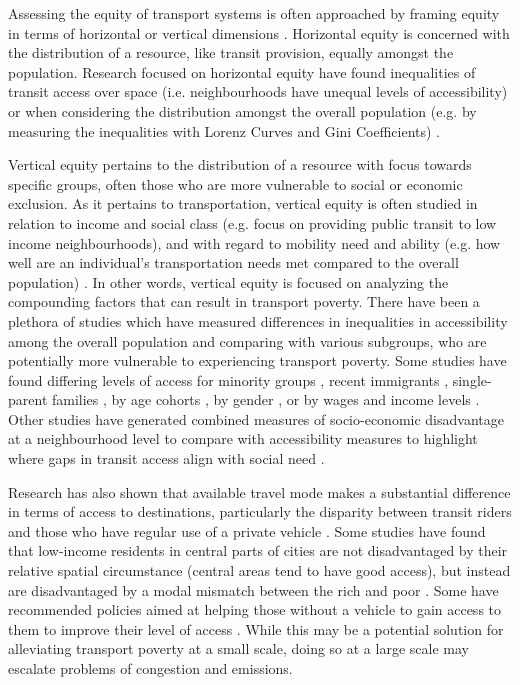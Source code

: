 \documentclass[11 pt, letterpaper]{article}
\begin{document}
{Assessing the equity of transport systems is often approached by framing equity in terms of horizontal or vertical dimensions \cite{litman2002,delbosc2011c,pereira2017}. Horizontal equity is concerned with the distribution of a resource, like transit provision, equally amongst the population. Research focused on horizontal equity have found inequalities of transit access over space (i.e. neighbourhoods have unequal levels of accessibility) or when considering the distribution amongst the overall population (e.g. by measuring the inequalities with Lorenz Curves and Gini Coefficients) \cite{delbosc2011c,martens2012justice, welch2013}.

Vertical equity pertains to the distribution of a resource with focus towards specific groups, often those who are more vulnerable to social or economic exclusion. As it pertains to transportation, vertical equity is often studied in relation to income and social class (e.g. focus on providing public transit to low income neighbourhoods), and with regard to mobility need and ability (e.g. how well are an individual's transportation needs met compared to the overall population) \cite{litman2002,welch2013}. In other words, vertical equity is focused on analyzing the compounding factors that can result in transport poverty. There have been a plethora of studies which have measured differences in inequalities in accessibility among the overall population and comparing with various subgroups, who are potentially more vulnerable to experiencing transport poverty. Some studies have found differing levels of access for minority groups , recent immigrants , single-parent families , by age cohorts , by gender , or by wages and income levels . Other studies have generated combined measures of socio-economic disadvantage at a neighbourhood level to compare with accessibility measures to highlight where gaps in transit access align with social need .

Research has also shown that available travel mode makes a substantial difference in terms of access to destinations, particularly the disparity between transit riders and those who have regular use of a private vehicle . Some studies have found that low-income residents in central parts of cities are not disadvantaged by their relative spatial circumstance (central areas tend to have good access), but instead are disadvantaged by a modal mismatch between the rich and poor . Some have recommended policies aimed at helping those without a vehicle to gain access to them to improve their level of access . While this may be a potential solution for alleviating transport poverty at a small scale, doing so at a large scale may escalate problems of congestion and emissions.

}
\end{document}
